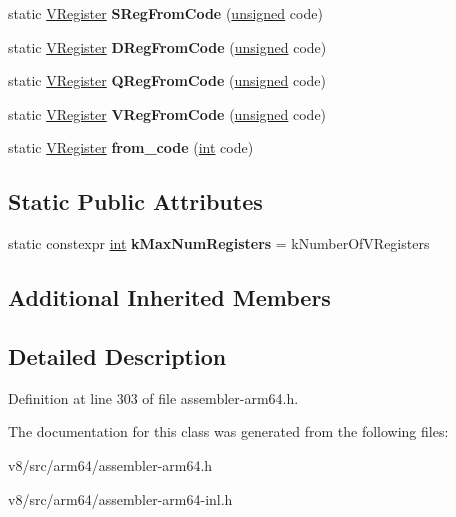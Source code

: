 \begin{DoxyCompactItemize}
static \mbox{\hyperlink{classv8_1_1internal_1_1VRegister}{V\+Register}} {\bfseries S\+Reg\+From\+Code} (\mbox{\hyperlink{classunsigned}{unsigned}} code)
\item 
\mbox{\label{classv8_1_1internal_1_1VRegister_a9f9210a9087e7f15c3fe780f6c874cbf}} 
static \mbox{\hyperlink{classv8_1_1internal_1_1VRegister}{V\+Register}} {\bfseries D\+Reg\+From\+Code} (\mbox{\hyperlink{classunsigned}{unsigned}} code)
\item 
\mbox{\label{classv8_1_1internal_1_1VRegister_a9e464a287b51d00d412dac0fbc983487}} 
static \mbox{\hyperlink{classv8_1_1internal_1_1VRegister}{V\+Register}} {\bfseries Q\+Reg\+From\+Code} (\mbox{\hyperlink{classunsigned}{unsigned}} code)
\item 
\mbox{\label{classv8_1_1internal_1_1VRegister_a733b3df29823d0ab784148a89b57e6c5}} 
static \mbox{\hyperlink{classv8_1_1internal_1_1VRegister}{V\+Register}} {\bfseries V\+Reg\+From\+Code} (\mbox{\hyperlink{classunsigned}{unsigned}} code)
\item 
\mbox{\label{classv8_1_1internal_1_1VRegister_a956e373f65340c5ea7caba21e779e053}} 
static \mbox{\hyperlink{classv8_1_1internal_1_1VRegister}{V\+Register}} {\bfseries from\+\_\+code} (\mbox{\hyperlink{classint}{int}} code)
\end{DoxyCompactItemize}
\subsection*{Static Public Attributes}
\begin{DoxyCompactItemize}
\item 
\mbox{\label{classv8_1_1internal_1_1VRegister_a9659edbaf9a753bb5ad199e1698b87e5}} 
static constexpr \mbox{\hyperlink{classint}{int}} {\bfseries k\+Max\+Num\+Registers} = k\+Number\+Of\+V\+Registers
\end{DoxyCompactItemize}
\subsection*{Additional Inherited Members}


\subsection{Detailed Description}


Definition at line 303 of file assembler-\/arm64.\+h.



The documentation for this class was generated from the following files\+:\begin{DoxyCompactItemize}
\item 
v8/src/arm64/assembler-\/arm64.\+h\item 
v8/src/arm64/assembler-\/arm64-\/inl.\+h\end{DoxyCompactItemize}
